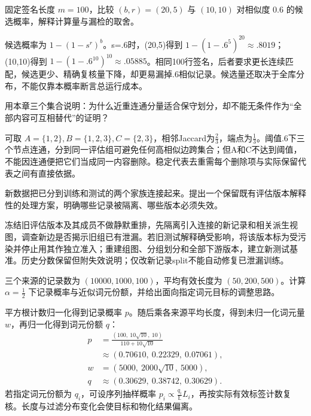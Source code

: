 \begin{exercises}
\begin{exercise}\optional 固定签名长度 $m=100$，比较 $(b,r)=(20,5)$ 与 $(10,10)$ 对相似度 $0.6$ 的候选概率，解释计算量与漏检的取舍。

\begin{solution}
候选概率为 $1-(1-s^r)^b$。s=.6时，(20,5)得到 $1-(1-.6^5)^{20}\approx.8019$；(10,10)得到 $1-(1-.6^{10})^{10}\approx.05885$。相同100行签名，后者要求更长连续匹配，候选更少、精确复核量下降，却更易漏掉.6相似记录。候选量还取决于全库分布，不能仅靠本概率断言总运行成本。
\end{solution}
\end{exercise}

\begin{exercise} 用本章三个集合说明：为什么近重连通分量适合保守划分，却不能无条件作为“全部内容可互相替代”的证明？

\begin{solution}
可取 $A=\{1,2\},B=\{1,2,3\},C=\{2,3\}$，相邻Jaccard为$\frac{2}{3}$，端点为$\frac{1}{3}$。阈值.6下三个节点连通，分到同一评估组可避免任何高相似边跨集合；但A和C不达到阈值，不能因连通便把它们当成同一内容删除。稳定代表去重需每个删除项与实际保留代表之间有直接依据。
\end{solution}
\end{exercise}

\begin{exercise} 新数据把已分到训练和测试的两个家族连接起来。提出一个保留既有评估版本解释性的处理方案，明确哪些记录被隔离、哪些版本必须失效。

\begin{solution}
冻结旧评估版本及其成员不做静默重排，先隔离引入连接的新记录和相关派生视图，调查新边是否揭示旧组已有泄漏。若旧测试解释确受影响，将该版本标为受污染并停止用其作独立准入；重建组图、分组划分和全部下游版本，建立新测试基准。历史分数保留但附失效说明；仅改新记录split不能自动修复已泄漏训练。
\end{solution}
\end{exercise}

\begin{exercise} 三个来源的记录数为 $(10000,1000,100)$，平均有效长度为 $(50,200,500)$。计算 $\alpha=\frac{1}{2}$ 下记录概率与近似词元份额，并给出面向指定词元目标的调整思路。

\begin{solution}
平方根计数归一化得到记录概率 $p$。随后乘各来源平均长度，得到未归一化词元量 $w$，再归一化得到词元份额 $q$：
\[
\begin{aligned}
p&=\frac{(100,\ 10\sqrt{10},\ 10)}{110+10\sqrt{10}}\\
 &\approx(0.70610,\ 0.22329,\ 0.07061),\\
w&=(5000,\ 2000\sqrt{10},\ 5000),\\
q&\approx(0.30629,\ 0.38742,\ 0.30629).
\end{aligned}
\]
若指定词元份额为 $q_i$，可设序列抽样概率 $p_i\propto \frac{q_i}{\mathbb E} L_i$，再按实际有效标签计数复核。长度与过滤分布变化会使目标和物化结果偏离。
\end{solution}
\end{exercise}


\end{exercises}
